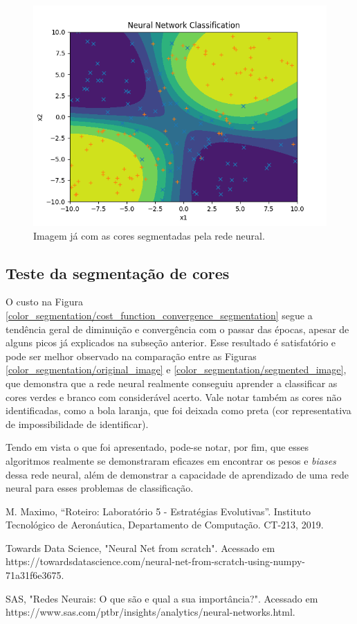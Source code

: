 \documentclass[conference]{IEEEtran}
\begin{document}
\begin{figure}[htbp]
\centering
\centerline{\includegraphics[scale=0.5]{imagens/xor/nn_classification_xor.png}}
\caption{Imagem já com as cores segmentadas pela rede neural.}
\label{xor/nn_classification_xor}
\end{figure}

\subsection{Teste da segmentação de cores}

O custo na Figura \ref{color_segmentation/cost_function_convergence_segmentation} segue a tendência geral de diminuição e convergência com o passar das épocas, apesar de alguns picos já explicados na subseção anterior. Esse resultado é satisfatório e pode ser melhor observado na comparação entre as Figuras \ref{color_segmentation/original_image} e \ref{color_segmentation/segmented_image}, que demonstra que a rede neural realmente conseguiu aprender a classificar as cores verdes e branco com considerável acerto. Vale notar também as cores não identificadas, como a bola laranja, que foi deixada como preta (cor representativa de impossibilidade de identificar).

Tendo em vista o que foi apresentado, pode-se notar, por fim, que esses algoritmos realmente se demonstraram eficazes em encontrar os pesos e \textit{biases} dessa rede neural, além de demonstrar a capacidade de aprendizado de uma rede neural para esses problemas de classificação.

\begin{thebibliography}{00}
 M. Maximo, ``Roteiro: Laboratório 5 - Estratégias Evolutivas''. Instituto Tecnológico de Aeronáutica, Departamento de Computação. CT-213, 2019.

 Towards Data Science, "Neural Net from scratch". Acessado em https://towardsdatascience.com/neural-net-from-scratch-using-numpy-71a31f6e3675.

 SAS, "Redes Neurais: O que são e qual a sua importância?". Acessado em https://www.sas.com/pt\underline{\space}br/insights/analytics/neural-networks.html.

\end{thebibliography}
\end{document}
